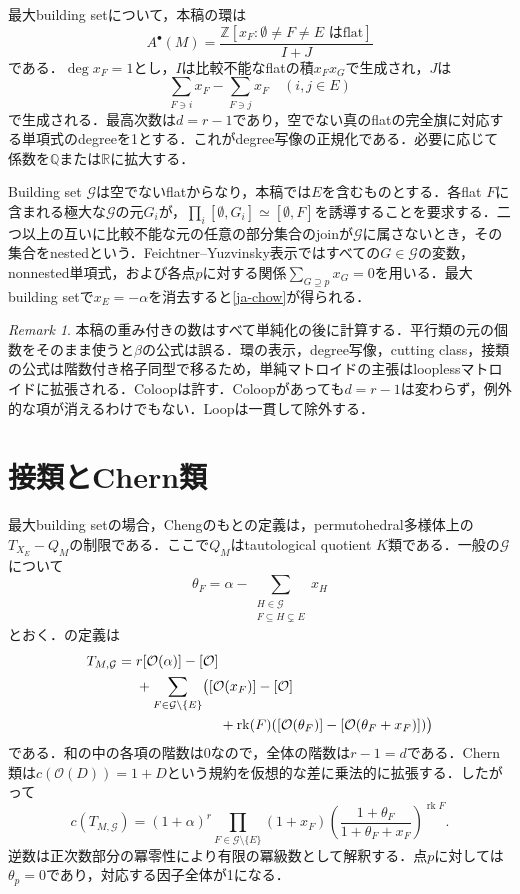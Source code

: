 \documentclass[12pt]{amsart}
\theoremstyle{definition}
\theoremstyle{remark}
\newtheorem{rem}[thm]{Remark}
\numberwithin{equation}{section}
\newcommand{\rk}{\operatorname{rk}}
\newcommand{\R}{\mathbb{R}}
\newcommand{\Z}{\mathbb{Z}}
\newcommand{\Q}{\mathbb{Q}}
\begin{document}
最大building setについて，本稿の環は
\begin{equation}\label{ja-chow}
 A^\bullet(M)=\frac{\Z[x_F:\emptyset\ne F\ne E\text{ はflat}]}{I+J}
\end{equation}
である．$\deg x_F=1$とし，$I$は比較不能なflatの積$x_Fx_G$で生成され，$J$は
\[
 \sum_{F\ni i}x_F-\sum_{F\ni j}x_F\quad(i,j\in E)
\]
で生成される．最高次数は$d=r-1$であり，空でない真のflatの完全旗に対応する単項式のdegreeを1とする．これがdegree写像の正規化である．必要に応じて係数を$\Q$または$\R$に拡大する\cite{FY,AHK}．

Building set $\mathcal G$は空でないflatからなり，本稿では$E$を含むものとする．各flat $F$に含まれる極大な$\mathcal G$の元$G_i$が，$\prod_i[\emptyset,G_i]\simeq[\emptyset,F]$を誘導することを要求する．二つ以上の互いに比較不能な元の任意の部分集合のjoinが$\mathcal G$に属さないとき，その集合をnestedという．Feichtner--Yuzvinsky表示ではすべての$G\in\mathcal G$の変数，nonnested単項式，および各点$p$に対する関係$\sum_{G\supseteq p}x_G=0$を用いる．最大building setで$x_E=-\alpha$を消去すると\eqref{ja-chow}が得られる\cite[Definitions 1--3]{FY}．

\begin{rem}
本稿の重み付きの数はすべて単純化の後に計算する．平行類の元の個数をそのまま使うと$\beta$の公式は誤る．環の表示，degree写像，cutting class，接類の公式は階数付き格子同型で移るため，単純マトロイドの主張はlooplessマトロイドに拡張される．Coloopは許す．Coloopがあっても$d=r-1$は変わらず，例外的な項が消えるわけでもない．Loopは一貫して除外する．
\end{rem}

\section{接類とChern類}
最大building setの場合，Chengのもとの定義は，permutohedral多様体上の$T_{X_E}-Q_M$の制限である．ここで$Q_M$はtautological quotient $K$類である\cite[Definition 3.1]{Che}．一般の$\mathcal G$について
\[
 \theta_F=\alpha-\sum_{\substack{H\in\mathcal G\\F\subseteq H\subsetneq E}}x_H
\]
とおく．\cite[Definition 3.3]{CheG}の定義は
\begin{align}\label{ja-tangent}
 T_{M,\mathcal G}={}&r[\mathcal O(\alpha)]-[\mathcal O]\notag\\
 &+\sum_{F\in\mathcal G\setminus\{E\}}\bigl([\mathcal O(x_F)]-[\mathcal O]\notag\\
 &\hspace{21mm}+\rk(F)([\mathcal O(\theta_F)]-[\mathcal O(\theta_F+x_F)])\bigr)
\end{align}
である．和の中の各項の階数は0なので，全体の階数は$r-1=d$である．Chern類は$c(\mathcal O(D))=1+D$という規約を仮想的な差に乗法的に拡張する．したがって
\begin{equation}\label{ja-total}
 c(T_{M,\mathcal G})=(1+\alpha)^r
 \prod_{F\in\mathcal G\setminus\{E\}}(1+x_F)
 \left(\frac{1+\theta_F}{1+\theta_F+x_F}\right)^{\rk F}.
\end{equation}
逆数は正次数部分の冪零性により有限の冪級数として解釈する．点$p$に対しては$\theta_p=0$であり，対応する因子全体が1になる．
\end{document}
